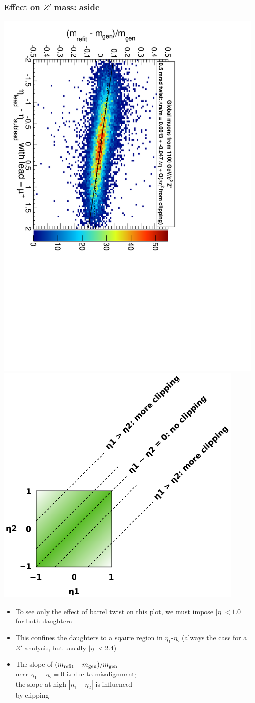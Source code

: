 \documentclass[compress]{beamer}
\newcommand{\s}[1]{{\mbox{\scriptsize #1}}}
\begin{document}
\begin{frame}
\frametitle{Effect on $Z'$ mass: aside}
\vspace{0.5 cm}
\includegraphics[height=0.49\linewidth, angle=90]{massbias_twist0_5mrad_1100_GlobalMuons2_plus.pdf}
\includegraphics[width=0.49\linewidth]{clipping.png}

\vspace{-8.3 cm}
\begin{itemize}
\item To see only the effect of barrel twist on this plot, we must impose $|\eta| < 1.0$ for both daughters
\item This confines the daughters to a sqaure region in $\eta_1$-$\eta_2$ (always the case for a $Z'$ analysis, but usually $|\eta| < 2.4$)
\item The slope of $(m_\s{refit} - m_\s{gen})/m_\s{gen}$ \\ near $\eta_1 - \eta_2 = 0$ is due to misalignment; \\ the slope at high $|\eta_1 - \eta_2|$ is influenced \\ by clipping
\end{itemize}
\end{frame}
\end{document}
